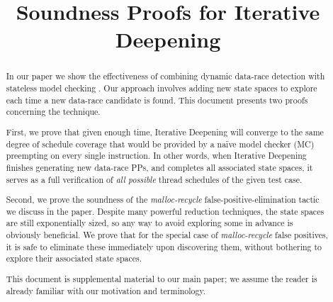 \documentclass[10pt,times,numbers]{../sigplanconf}
\begin{document}
%
%

\newcommand\quicksand{\textsc{Quicksand}}
\newcommand\simics{\textsc{Simics}}
\newcommand{\sect}[1]{\S #1}
\newcommand\hilight[2]{\color{#1}#2\color{black}}

\title{Soundness Proofs for Iterative Deepening}

\maketitle
\begin{abstract}
In our paper we show the effectiveness of combining dynamic data-race detection \cite{eraser,hybriddatarace} with stateless model checking \cite{verisoft,dpor}.
Our approach involves adding new state spaces to explore each time a new data-race candidate is found.
This document presents two proofs concerning the technique.

First, we prove that given enough time, Iterative Deepening will converge to the same degree of schedule coverage that would be provided by a na\"{i}ve model checker (MC) preempting on every single instruction.
In other words, when Iterative Deepening finishes generating new data-race PPs, and completes all associated state spaces,
it serves as a full verification of {\em all possible} thread schedules of the given test case.

Second, we prove the soundness of the {\em malloc-recycle} false-positive-elimination tactic we discuss in the paper.
Despite many powerful reduction techniques, the state spaces are still exponentially sized,
so any way to avoid exploring some in advance is obviously beneficial.
We prove that for the special case of {\em malloc-recycle} false positives, it is safe to eliminate these immediately upon discovering them, without bothering to explore their associated state spaces.


This document is supplemental material to our main paper; we assume the reader is already familiar with our motivation and terminology.
\end{abstract}
\end{document}
